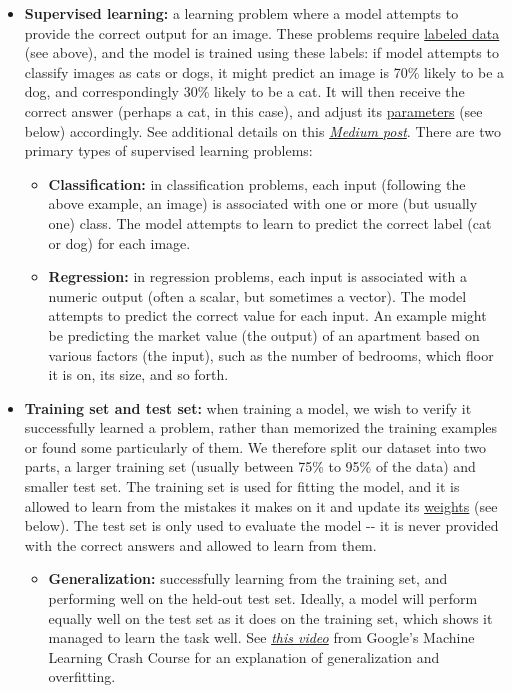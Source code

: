 \begin{itemize}
\item \textbf{Supervised learning:\label{tg:supervised}} a learning problem where a model attempts to provide the correct output for an image. These problems require \hyperref[tg:labeled-data]{labeled data} (see above), and the model is trained using these labels: if model attempts to classify images as cats or dogs, it might predict an image is 70\% likely to be a dog, and correspondingly 30\% likely to be a cat. It will then receive the correct answer (perhaps a cat, in this case), and adjust its \hyperref[tg:weights]{parameters} (see below) accordingly. See additional details on this \href{https://medium.com/machine-learning-for-humans/supervised-learning-740383a2feab}{\emph{Medium post}}. There are two primary types of supervised learning problems:
  \begin{itemize}
  \item \textbf{Classification:\label{tg:classification}} in classification problems, each input (following the above example, an image) is associated with one or more (but usually one) class. The model attempts to learn to predict the correct label (cat or dog) for each image.
  
  \item \textbf{Regression:\label{tg:regression}} in regression problems, each input is associated with a numeric output (often a scalar, but sometimes a vector). The model attempts to predict the correct value for each input. An example might be predicting the market value (the output) of an apartment based on various factors (the input), such as the number of bedrooms, which floor it is on, its size, and so forth.
  \end{itemize}
  
\item \textbf{Training set and test set:\label{tg:training-test}} when training a model, we wish to verify it successfully learned a problem, rather than memorized the training examples or found some particularly of them. We therefore split our dataset into two parts, a larger training set (usually between 75\% to 95\% of the data) and smaller test set. The training set is used for fitting the model, and it is allowed to learn from the mistakes it makes on it and update its \hyperref[tg:weights]{weights} (see below). The test set is only used to evaluate the model -\/- it is never provided with the correct answers and allowed to learn from them.

  \begin{itemize}
  \item \textbf{Generalization:\label{tg:generalization}} successfully learning from the training set, and performing well on the held-out test set. Ideally, a model will perform equally well on the test set as it does on the training set, which shows it managed to learn the task well. See \href{https://developers.google.com/machine-learning/crash-course/generalization/video-lecture}{\emph{this video}} from Google's Machine Learning Crash Course for an explanation of generalization and overfitting.
  

\end{itemize}
\end{itemize}
